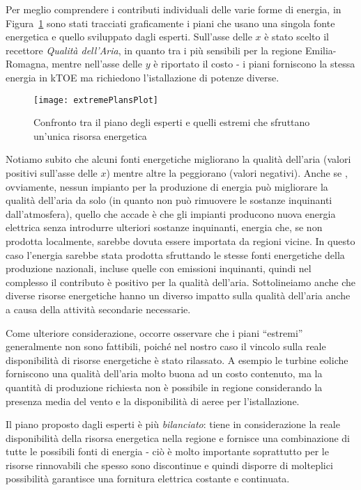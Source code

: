Per meglio comprendere i contributi individuali delle varie forme di energia, in Figura~\ref{extremePlansPlot} sono stati tracciati graficamente i piani che usano una singola fonte energetica e quello sviluppato dagli esperti. Sull'asse delle $x$ è stato scelto il recettore \emph{Qualità dell'Aria}, in quanto tra i più sensibili per la regione Emilia-Romagna, mentre nell'asse delle $y$ è riportato il costo - i piani forniscono la stessa energia in kTOE ma richiedono l'istallazione di potenze diverse.

\begin{figure}[h]
	\centering
	\texttt{[image: extremePlansPlot]}
	\caption{Confronto tra il piano degli esperti e quelli estremi che sfruttano un'unica risorsa energetica}
	\label{extremePlansPlot}
\end{figure}

Notiamo subito che alcuni fonti energetiche migliorano la qualità dell'aria (valori positivi sull'asse delle $x$) mentre altre la peggiorano (valori negativi). Anche se , ovviamente, nessun impianto per la produzione di energia può migliorare la qualità dell'aria da solo (in quanto non può rimuovere le sostanze inquinanti dall'atmosfera), quello che accade è che gli impianti producono nuova energia elettrica senza introdurre ulteriori sostanze inquinanti, energia che, se non prodotta localmente, sarebbe dovuta essere importata da regioni vicine. In questo caso l'energia sarebbe stata prodotta sfruttando le stesse fonti energetiche della produzione nazionali, incluse quelle con emissioni inquinanti, quindi nel complesso il contributo è positivo per la qualità dell'aria. Sottolineiamo anche che diverse risorse energetiche hanno un diverso impatto sulla qualità dell'aria anche a causa della attività secondarie necessarie. 

Come ulteriore considerazione, occorre osservare che i piani ``estremi'' generalmente non sono fattibili, poiché nel nostro caso il vincolo sulla reale disponibilità di risorse energetiche è stato rilassato. A esempio le turbine eoliche forniscono una qualità dell'aria molto buona ad un costo contenuto, ma la quantità di produzione richiesta non è possibile in regione considerando la presenza media del vento e la disponibilità di aeree per l'istallazione.

Il piano proposto dagli esperti è più \emph{bilanciato}: tiene in considerazione la reale disponibilità della risorsa energetica nella regione e fornisce una combinazione di tutte le possibili fonti di energia - ciò è molto importante soprattutto per le risorse rinnovabili che spesso sono discontinue e quindi disporre di molteplici possibilità garantisce una fornitura elettrica costante e continuata.

